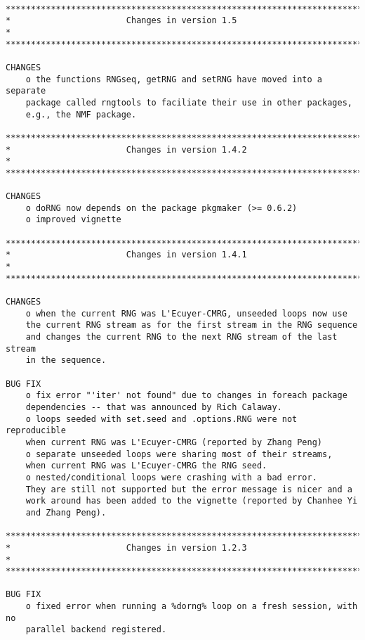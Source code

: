 \documentclass[a4paper,12pt]{article}\usepackage{graphicx, color}
\begin{document}
{\scriptsize
\begin{verbatim}

*************************************************************************
*                       Changes in version 1.5                          *
*************************************************************************

CHANGES
    o the functions RNGseq, getRNG and setRNG have moved into a separate
    package called rngtools to faciliate their use in other packages,
    e.g., the NMF package.

*************************************************************************
*                       Changes in version 1.4.2                        *
*************************************************************************

CHANGES
    o doRNG now depends on the package pkgmaker (>= 0.6.2)
    o improved vignette

*************************************************************************
*                       Changes in version 1.4.1                        *
*************************************************************************

CHANGES
    o when the current RNG was L'Ecuyer-CMRG, unseeded loops now use 
    the current RNG stream as for the first stream in the RNG sequence 
    and changes the current RNG to the next RNG stream of the last stream 
    in the sequence. 

BUG FIX
    o fix error "'iter' not found" due to changes in foreach package 
    dependencies -- that was announced by Rich Calaway.
    o loops seeded with set.seed and .options.RNG were not reproducible
    when current RNG was L'Ecuyer-CMRG (reported by Zhang Peng)
    o separate unseeded loops were sharing most of their streams, 
    when current RNG was L'Ecuyer-CMRG the RNG seed.
    o nested/conditional loops were crashing with a bad error. 
    They are still not supported but the error message is nicer and a 
    work around has been added to the vignette (reported by Chanhee Yi 
    and Zhang Peng).

*************************************************************************
*                       Changes in version 1.2.3                        *
*************************************************************************

BUG FIX
    o fixed error when running a %dorng% loop on a fresh session, with no  
    parallel backend registered.  


\end{verbatim}}
\end{document}
